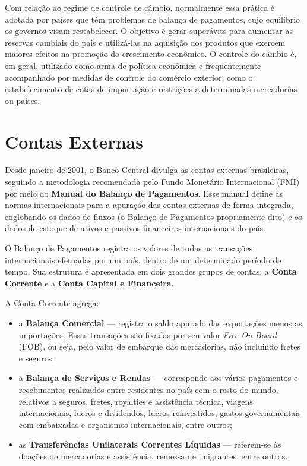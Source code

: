 \documentclass{article}\usepackage[]{graphicx}\usepackage[]{xcolor}
\begin{document}
Com relação ao regime de controle de câmbio, normalmente essa prática é adotada por países que têm 
problemas de balanço de pagamentos, cujo equilíbrio os governos visam restabelecer. O objetivo é gerar 
superávits para aumentar as reservas cambiais do país e utilizá-las na aquisição dos produtos que exercem 
maiores efeitos na promoção do crescimento econômico. O controle do câmbio é, em geral, utilizado como 
arma de política econômica e  frequentemente acompanhado por medidas de controle do comércio exterior, 
como o estabelecimento de cotas de importação e restrições a determinadas mercadorias ou países.\par

\section*{Contas Externas}

Desde janeiro de 2001, o Banco Central divulga as contas externas brasileiras, seguindo a metodologia 
recomendada pelo Fundo Monetário Internacional (FMI) por meio do \textbf{Manual do Balanço de Pagamentos}. 
Esse manual define as normas internacionais para a apuração das contas externas de forma integrada, 
englobando os dados de fluxos (o Balanço de Pagamentos propriamente dito) e os dados de estoque de 
ativos e passivos financeiros internacionais do país.\par

O Balanço de Pagamentos registra os valores de todas as transações internacionais efetuadas por um país, 
dentro de um determinado período de tempo. Sua estrutura é apresentada em dois grandes grupos de contas: 
a \textbf{Conta Corrente} e a \textbf{Conta Capital e Financeira}.\par

A Conta Corrente agrega:

\begin{itemize}

  \item a \textbf{Balança Comercial} --- registra o saldo apurado das exportações menos as importações. Essas 
        transações são fixadas por seu valor \textit{Free On Board} (FOB), ou seja, pelo valor de embarque das 
        mercadorias, não incluindo fretes e seguros;
        
  \item a \textbf{Balança de Serviços e Rendas} --- corresponde aos vários pagamentos e recebimentos realizados 
        entre residentes no país com o resto do mundo, relativos a seguros, fretes, royalties e assistência 
        técnica, viagens internacionais, lucros e dividendos, lucros reinvestidos, gastos governamentais 
        com embaixadas e organismos internacionais, entre outros;
  
  \item as \textbf{Transferências Unilaterais Correntes Líquidas} --- referem-se às doações de mercadorias e 
        assistência, remessa de imigrantes, entre outros.

\end{itemize}
\end{document}
